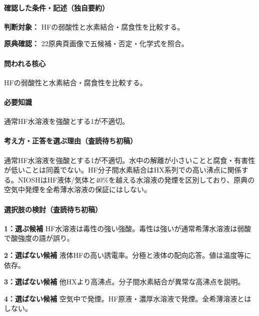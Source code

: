 \paragraph{確認した条件・記述（独自要約）}\mbox{}\par

\noindent\textbf{判断対象：} HFの弱酸性と水素結合・腐食性を比較する。\par

\noindent\textbf{原典確認：} 22原典頁画像で五候補・否定・化学式を照合。\par

\paragraph{問われる核心} HFの弱酸性と水素結合・腐食性を比較する。

\paragraph{必要知識} 通常HF水溶液を強酸とする1が不適切。

\paragraph{考え方・正答を選ぶ理由（査読待ち初稿）} 通常HF水溶液を強酸とする1が不適切。水中の解離が小さいことと腐食・有害性が低いことは同義でない。HF分子間水素結合はHX系列での高い沸点に関係する。NIOSHはHF液体/気体と40\%を越える水溶液の発煙を区別しており、原典の空気中発煙を全希薄水溶液の保証にはしない。

\paragraph{選択肢の検討（査読待ち初稿）}\mbox{}\par

\noindent\textbf{1：選ぶ候補} HF水溶液は毒性の強い強酸。毒性は強いが通常希薄水溶液は弱酸で酸強度の語が誤り。\par

\noindent\textbf{2：選ばない候補} 液体HFの高い誘電率。分極と液体の配向応答。値は温度等に依存。\par

\noindent\textbf{3：選ばない候補} 他HXより高沸点。分子間水素結合が異常な高沸点を説明。\par

\noindent\textbf{4：選ばない候補} 空気中で発煙。HF原液・濃厚水溶液で発煙。全希薄溶液とはしない。\par

